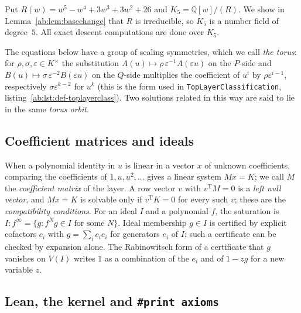 \documentclass[a4paper,11pt]{article}
\theoremstyle{jsplain}
\theoremstyle{jsdef}
\theoremstyle{jsrem}
\begin{document}
Put $R(w)=w^5-w^4+3w^3+3w^2+26$ and $K_5=\mathbb{Q}[w]/(R)$. We show in Lemma~\ref{ab:lem:basechange} that $R$ is irreducible, so $K_5$ is a number field of degree~$5$. All exact descent computations are done over $K_5$.

The equations below have a group of scaling symmetries, which we call \emph{the torus}: for $\rho,\sigma,\varepsilon\in K^\times$ the substitution $A(u)\mapsto\rho\,\varepsilon^{-1}A(\varepsilon u)$ on the $P$-side and $B(u)\mapsto\sigma\,\varepsilon^{-2}B(\varepsilon u)$ on the $Q$-side multiplies the coefficient of $u^i$ by $\rho\varepsilon^{i-1}$, respectively $\sigma\varepsilon^{k-2}$ for $u^k$ (this is the form used in \texttt{TopLayerClassification}, listing~\ref{ab:lst:def-toplayerclass}). Two solutions related in this way are said to lie in the same \emph{torus orbit}.

\subsection{Coefficient matrices and ideals}

When a polynomial identity in $u$ is linear in a vector $x$ of unknown coefficients, comparing the coefficients of $1,u,u^2,\dots$ gives a linear system $Mx=K$; we call $M$ the \emph{coefficient matrix} of the layer. A row vector $v$ with $v^{\mathrm T}M=0$ is a \emph{left null vector}, and $Mx=K$ is solvable only if $v^{\mathrm T}K=0$ for every such $v$; these are the \emph{compatibility conditions}. For an ideal $I$ and a polynomial $f$, the saturation is $I:f^\infty=\{g:f^Ng\in I\text{ for some }N\}$. Ideal membership $g\in I$ is certified by explicit cofactors $c_i$ with $g=\sum_ic_ie_i$ for generators $e_i$ of $I$; such a certificate can be checked by expansion alone. The Rabinowitsch form of a certificate that $g$ vanishes on $V(I)$ writes $1$ as a combination of the $e_i$ and of $1-zg$ for a new variable $z$.

\subsection{Lean, the kernel and \texttt{\#print axioms}}
\end{document}
